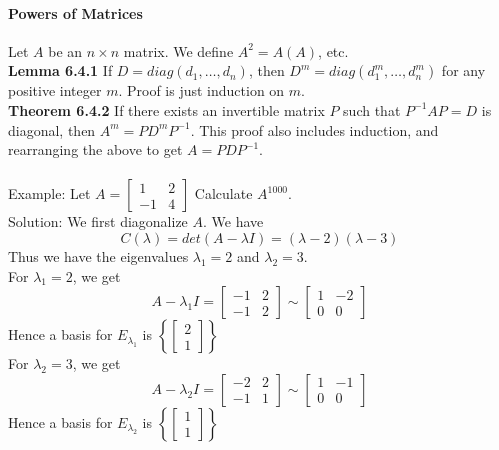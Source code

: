 \documentclass[10pt,letter]{article}
\begin{document}
\paragraph{Powers of Matrices} Let $A$ be an $n\times n$ matrix. We define $A^2=A(A)$, etc. \\ 
\textbf{Lemma 6.4.1} If $D=diag(d_1,\ldots,d_n)$, then $D^m=diag(d_1^m,\ldots,d_n^m)$ for any positive integer $m$. Proof is just induction on $m$. \\ 
\textbf{Theorem 6.4.2} If there exists an invertible matrix $P$ such that $P^{-1}AP=D$ is diagonal, then $A^m=PD^mP^{-1}$. This proof also includes induction, and rearranging the above to get $A=PDP^{-1}$. \\ \\ 
Example: Let $A=\begin{bmatrix}1&2\\-1&4\end{bmatrix}$ Calculate $A^{1000}$. \\ 
Solution: We first diagonalize $A$. We have $$C(\lambda)=det(A-\lambda I)=(\lambda-2)(\lambda-3)$$ Thus we have the eigenvalues $\lambda_1=2$ and $\lambda_2=3$. \\ 
For $\lambda_1=2$, we get $$A-\lambda_1I=\begin{bmatrix}-1&2\\-1&2\end{bmatrix}\sim\begin{bmatrix}1&-2\\0&0\end{bmatrix}$$ Hence a basis for $E_{\lambda_1}$ is $\left\{\begin{bmatrix}2\\1\end{bmatrix}\right\}$ \\ 
For $\lambda_2=3$, we get $$A-\lambda_2I=\begin{bmatrix}-2&2\\-1&1\end{bmatrix}\sim\begin{bmatrix}1&-1\\0&0\end{bmatrix}$$ Hence a basis for $E_{\lambda_2}$ is $\left\{\begin{bmatrix}1\\1\end{bmatrix}\right\}$ \\ 
\end{document}
